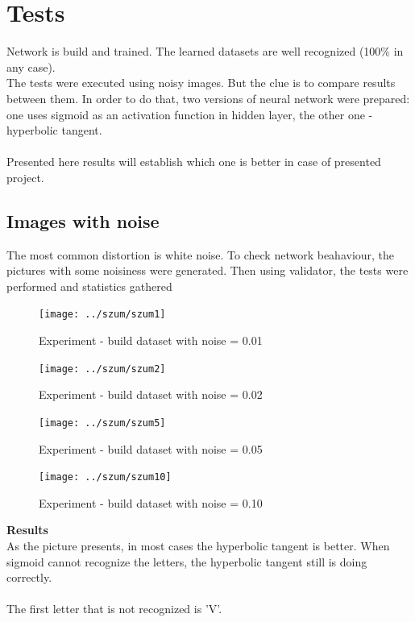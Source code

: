 \documentclass[eng,openany]{mgr}
\begin{document}
\chapter{Tests}
Network is build and trained. The learned datasets are well recognized (100\% in any case).\\
The tests were executed using noisy images. But the clue is to compare results between them.
In order to do that, two versions of neural network were prepared: one uses sigmoid as an activation function in hidden layer, the other one - hyperbolic tangent.\\
\\
Presented here results will establish which one is better in case of presented project.\\


\section{Images with noise}
The most common distortion is white noise. To check network beahaviour, the pictures with some noisiness were generated. Then using validator, the tests were performed and statistics gathered
\begin{figure}[h]
\centering
\texttt{[image: ../szum/szum1]}
\caption{Experiment - build dataset with noise = 0.01}
\label{fig:szum1}
\end{figure}

\begin{figure}[H]
\centering
\texttt{[image: ../szum/szum2]}
\caption{Experiment - build dataset with noise = 0.02}
\label{fig:szum2}
\end{figure}

\begin{figure}[H]
\centering
\texttt{[image: ../szum/szum5]}
\caption{Experiment - build dataset with noise = 0.05}
\label{fig:szum3}
\end{figure}

\begin{figure}[H]
\centering
\texttt{[image: ../szum/szum10]}
\caption{Experiment - build dataset with noise = 0.10}
\label{fig:szum4}
\end{figure}
\noindent
\textbf{Results}\\
As the picture presents, in most cases the hyperbolic tangent is better. When sigmoid cannot recognize the letters, the hyperbolic tangent still is doing correctly.
\\
\\
The first letter that is not recognized is 'V'.
\end{document}
